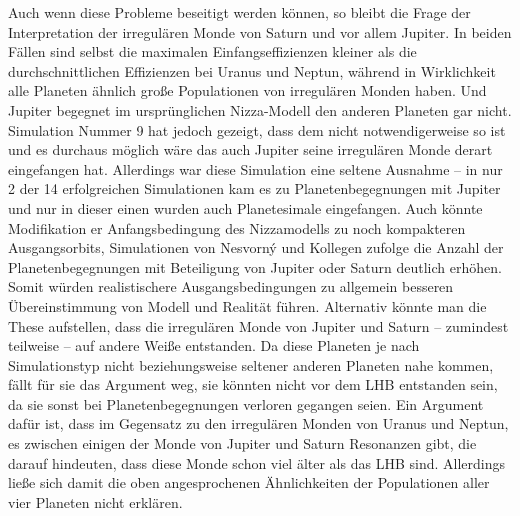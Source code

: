 \documentclass[10pt,a4paper,twoside]{article}
\begin{document}
Auch wenn diese Probleme beseitigt werden können, so bleibt die Frage der Interpretation der irregulären Monde von Saturn und vor allem Jupiter. In beiden Fällen sind selbst die maximalen Einfangseffizienzen kleiner als die durchschnittlichen Effizienzen bei Uranus und Neptun, %
während in Wirklichkeit alle Planeten ähnlich große Populationen von irregulären Monden haben\cite{Nesvorny2007}. %
Und Jupiter begegnet im ursprünglichen Nizza-Modell den anderen Planeten gar nicht.
Simulation Nummer 9 hat jedoch gezeigt, dass dem nicht notwendigerweise so ist und es durchaus möglich wäre das auch Jupiter seine irregulären Monde derart eingefangen hat.
Allerdings war diese Simulation eine seltene Ausnahme – in nur 2 der 14 erfolgreichen Simulationen kam es zu Planetenbegegnungen mit Jupiter und nur in dieser einen wurden auch Planetesimale eingefangen.
Auch könnte %
Modifikation er Anfangsbedingung des Nizzamodells zu noch kompakteren Ausgangsorbits, Simulationen von Nesvorný und Kollegen zufolge die Anzahl der Planetenbegegnungen mit Beteiligung von Jupiter oder Saturn deutlich erhöhen\cite{Nesvorny2007}.
Somit würden realistischere Ausgangsbedingungen zu allgemein besseren Übereinstimmung von Modell und Realität führen. %
Alternativ könnte man die These aufstellen, dass die irregulären Monde von Jupiter und Saturn – zumindest teilweise – auf andere Weiße entstanden. Da diese Planeten je nach Simulationstyp nicht beziehungsweise seltener anderen Planeten nahe kommen, fällt für sie das Argument weg, sie könnten nicht vor dem LHB entstanden sein, da sie sonst bei Planetenbegegnungen verloren gegangen seien.
Ein Argument dafür ist, dass im Gegensatz zu den irregulären Monden von Uranus und Neptun, es zwischen einigen der Monde von Jupiter und Saturn Resonanzen gibt, die darauf hindeuten, dass diese Monde schon viel älter als das LHB sind\cite{Nesvorny2007}. %
Allerdings ließe sich damit die oben angesprochenen Ähnlichkeiten der Populationen aller vier Planeten nicht erklären.


\newpage %

\FloatBarrier
\end{document}
